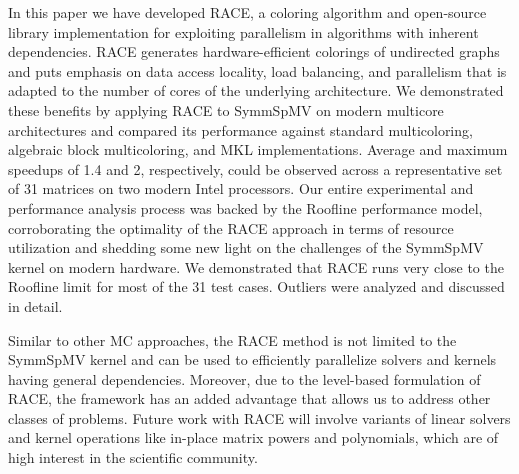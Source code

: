 In this paper we have developed \acrshort{RACE}, a coloring algorithm and open-source library
implementation for exploiting parallelism in algorithms with inherent dependencies.
\acrshort{RACE} generates hardware-efficient \DK colorings of undirected graphs and puts 
emphasis on data access locality, load balancing, and 
parallelism that is adapted to the number of cores of the underlying architecture.  We
demonstrated these benefits by applying \acrshort{RACE} to \acrfull{SymmSpMV} on modern
multicore architectures and compared its performance against
standard multicoloring, algebraic block multicoloring, and \acrshort{MKL}
implementations. Average and maximum speedups of 1.4 and 2, respectively,
could be observed across a representative set of 31 matrices on
two modern Intel processors. 
Our entire experimental and performance analysis process was backed by the
Roof{}line performance model, corroborating the optimality of
the \acrshort{RACE} approach in terms of resource utilization and shedding some new
light on the challenges of the \acrshort{SymmSpMV} kernel on modern hardware.
We demonstrated that \acrshort{RACE} runs very close to the Roof{}line limit for
most of the 31 test cases. Outliers were analyzed and discussed in detail.

Similar to other \acrshort{MC} approaches, the \acrshort{RACE} method is not
limited to the \acrshort{SymmSpMV} kernel and can be used to efficiently
parallelize solvers and kernels having general \DK dependencies. Moreover, due
to the level-based formulation of \acrshort{RACE}, the framework has an added
advantage that allows us to address other classes of problems. Future work
with \acrshort{RACE} will involve variants of linear solvers and kernel
operations like in-place matrix powers and polynomials, which are of high
interest in the scientific community.



